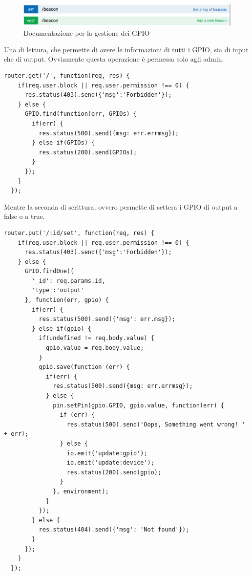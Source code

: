 \begin{figure}[h]
\centering
\includegraphics[width=1\textwidth]{API/beacon_03.png} 
\caption{Documentazione per la gestione dei GPIO}
\label{fig:user:login}
\end{figure}

Una di lettura, che permette di avere le informazioni di tutti i GPIO, sia di input che di output.
Ovviamente questa operazione è permessa solo agli admin.

\begin{lstlisting}[caption={/webserver/app/routes/setting.js hello}, style=javaScriptCode]
  router.get('/', function(req, res) {
    if(req.user.block || req.user.permission !== 0) {
      res.status(403).send({'msg':'Forbidden'});
    } else {
      GPIO.find(function(err, GPIOs) {
        if(err) {
          res.status(500).send({msg: err.errmsg});
        } else if(GPIOs) {
          res.status(200).send(GPIOs);
        }
      });
    }
  });
\end{lstlisting}

Mentre la seconda di scrittura, ovvero permette di settera i GPIO di output a false o a true.

\begin{lstlisting}[caption={/webserver/app/routes/setting.js hello}, style=javaScriptCode]
  router.put('/:id/set', function(req, res) {
    if(req.user.block || req.user.permission !== 0) {
      res.status(403).send({'msg':'Forbidden'});
    } else {
      GPIO.findOne({
        '_id': req.params.id,
        'type':'output'
      }, function(err, gpio) {
        if(err) {
          res.status(500).send({'msg': err.msg});
        } else if(gpio) {
          if(undefined != req.body.value) {
            gpio.value = req.body.value;
          }
          gpio.save(function (err) {
            if(err) {
              res.status(500).send({msg: err.errmsg});
            } else {
              pin.setPin(gpio.GPIO, gpio.value, function(err) {
                if (err) {
                  res.status(500).send('Oops, Something went wrong! ' + err);
                } else {
                  io.emit('update:gpio');
                  io.emit('update:device');
                  res.status(200).send(gpio);
                }
              }, environment);
            }
          });
        } else {
          res.status(404).send({'msg': 'Not found'});
        }
      });
    }
  });
\end{lstlisting}

